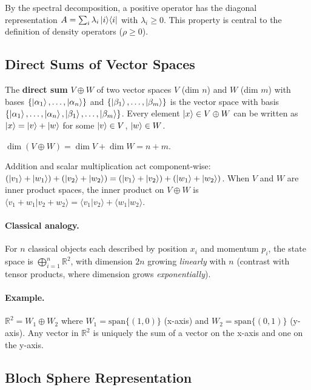 \documentclass[10pt,a4paper]{article}
\begin{document}
By the spectral decomposition, a positive operator has the diagonal representation $A=\sum_i\lambda_i\ket{i}\!\bra{i}$ with $\lambda_i\ge 0$. This property is central to the definition of density operators ($\rho\ge 0$).

\subsection{Direct Sums of Vector Spaces}

\begin{tcolorbox}[defstyle, title={Definition: Direct Sum}]
The \textbf{direct sum} $V\oplus W$ of two vector spaces $V$ (dim $n$) and $W$ (dim $m$) with bases $\{\ket{\alpha_1},\ldots,\ket{\alpha_n}\}$ and $\{\ket{\beta_1},\ldots,\ket{\beta_m}\}$ is the vector space with basis $\{\ket{\alpha_1},\ldots,\ket{\alpha_n},\ket{\beta_1},\ldots,\ket{\beta_m}\}$. Every element $\ket{x}\in V\oplus W$ can be written as $\ket{x}=\ket{v}+\ket{w}$ for some $\ket{v}\in V$, $\ket{w}\in W$.

$\dim(V\oplus W)=\dim V+\dim W=n+m$.
\end{tcolorbox}

Addition and scalar multiplication act component-wise: $(\ket{v_1}+\ket{w_1})+(\ket{v_2}+\ket{w_2})=(\ket{v_1}+\ket{v_2})+(\ket{w_1}+\ket{w_2})$. When $V$ and $W$ are inner product spaces, the inner product on $V\oplus W$ is $\langle v_1+w_1|v_2+w_2\rangle=\langle v_1|v_2\rangle+\langle w_1|w_2\rangle$.

\paragraph{Classical analogy.} For $n$ classical objects each described by position $x_i$ and momentum $p_i$, the state space is $\bigoplus_{i=1}^n\mathbb{R}^2$, with dimension $2n$ growing \emph{linearly} with $n$ (contrast with tensor products, where dimension grows \emph{exponentially}).

\paragraph{Example.} $\mathbb{R}^2=W_1\oplus W_2$ where $W_1=\mathrm{span}\{(1,0)\}$ (x-axis) and $W_2=\mathrm{span}\{(0,1)\}$ (y-axis). Any vector in $\mathbb{R}^2$ is uniquely the sum of a vector on the x-axis and one on the y-axis.

\subsection{Bloch Sphere Representation}
\end{document}
